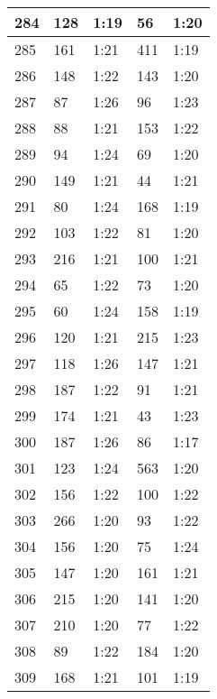 \begin{center}
\begin{longtable}{|p{2cm}|l|l|l|l|}
284	&   128           &  1:19  &		56      	& 1:20 \\ \hline
285	&   161           &  1:21  &		411     	& 1:19 \\ \hline
286	&   148           &  1:22  &		143     	& 1:20 \\ \hline
287	&   87            &  1:26  &		96      	& 1:23 \\ \hline
288	&   88            &  1:21  &		153     	& 1:22 \\ \hline
289	&   94            &  1:24  &		69      	& 1:20 \\ \hline
290	&   149           &  1:21  &		44          & 1:21 \\ \hline
291	&   80            &  1:24  &		168     	& 1:19 \\ \hline
292	&   103           &  1:22  &		81      	& 1:20 \\ \hline
293	&   216           &  1:21  &		100     	& 1:21 \\ \hline
294	&   65            &  1:22  &		73      	& 1:20 \\ \hline
295	&   60            &  1:24  &		158     	& 1:19 \\ \hline
296	&   120           &  1:21  &		215     	& 1:23 \\ \hline
297	&   118           &  1:26  &		147     	& 1:21 \\ \hline
298	&   187           &  1:22  &		91      	& 1:21 \\ \hline
299	&   174           &  1:21  &		43      	& 1:23 \\ \hline
300	&   187           &  1:26  &		86          & 1:17 \\ \hline
301	&   123           &  1:24  &		563     	& 1:20 \\ \hline
302	&   156           &  1:22  &		100     	& 1:22 \\ \hline
303	&   266           &  1:20  &		93          & 1:22 \\ \hline
304	&   156           &  1:20  &		75      	& 1:24 \\ \hline
305	&   147           &  1:20  &		161     	& 1:21 \\ \hline
306	&   215           &  1:20  &		141     	& 1:20 \\ \hline
307	&   210           &  1:20  &		77          & 1:22 \\ \hline
308	&   89            &  1:22  &		184     	& 1:20 \\ \hline
309	&   168           &  1:21  &		101     	& 1:19 \\ \hline

\end{longtable}
\end{center}
